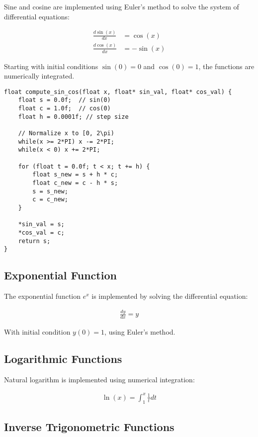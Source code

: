 \documentclass[12pt,a4paper]{article}
\begin{document}
Sine and cosine are implemented using Euler's method to solve the system of differential equations:

\begin{align}
\frac{d\sin(x)}{dx} &= \cos(x)\\
\frac{d\cos(x)}{dx} &= -\sin(x)
\end{align}

Starting with initial conditions $\sin(0) = 0$ and $\cos(0) = 1$, the functions are numerically integrated.

\begin{lstlisting}
float compute_sin_cos(float x, float* sin_val, float* cos_val) {
    float s = 0.0f;  // sin(0)
    float c = 1.0f;  // cos(0)
    float h = 0.0001f; // step size
    
    // Normalize x to [0, 2\pi)
    while(x >= 2*PI) x -= 2*PI;
    while(x < 0) x += 2*PI;
    
    for (float t = 0.0f; t < x; t += h) {
        float s_new = s + h * c;
        float c_new = c - h * s;
        s = s_new;
        c = c_new;
    }
    
    *sin_val = s;
    *cos_val = c;
    return s;
}
\end{lstlisting}

\subsection{Exponential Function}

The exponential function $e^x$ is implemented by solving the differential equation:

\begin{align}
\frac{dy}{dx} = y
\end{align}

With initial condition $y(0) = 1$, using Euler's method.

\subsection{Logarithmic Functions}

Natural logarithm is implemented using numerical integration:

\begin{align}
\ln(x) = \int_{1}^{x} \frac{1}{t} dt
\end{align}

\subsection{Inverse Trigonometric Functions}
\end{document}
